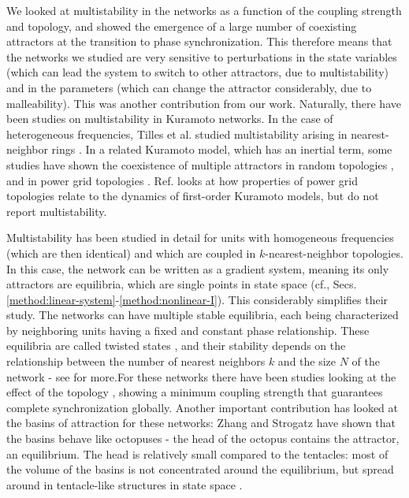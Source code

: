 We looked at multistability in the networks as a function of the coupling strength and topology, and showed the emergence of a large number of coexisting attractors at the transition to phase synchronization. This therefore means that the networks we studied are very sensitive to perturbations in the state variables (which can lead the system to switch to other attractors, due to multistability) and in the parameters (which can change the attractor considerably, due to malleability). This was another contribution from our work. Naturally, there have been studies on multistability in Kuramoto networks. In the case of heterogeneous frequencies, Tilles et al. studied multistability arising in nearest-neighbor rings \cite{tilles2011multistable}. In a related Kuramoto model, which has an inertial term, some studies have shown the coexistence of multiple attractors in random topologies \cite{gelbrecht2020monte}, and in power grid topologies \cite{hellmann2020network, halekotte2021transient}. Ref. \cite{potratzki2024synchronization} looks at how properties of power grid topologies relate to the dynamics of first-order Kuramoto models, but do not report multistability.

Multistability has been studied in detail for units with homogeneous frequencies (which are then identical) and which are coupled in $k$-nearest-neighbor topologies. In this case, the network can be written as a gradient system, meaning its only attractors are equilibria, which are single points in state space (cf., Secs. \ref{method:linear-system}-\ref{method:nonlinear-I}). This considerably simplifies their study. The networks can have multiple stable equilibria, each being characterized by neighboring units having a fixed and constant phase relationship. These equilibria are called twisted states \cite{wiley2006the}, and their stability depends on the relationship between the number of nearest neighbors $k$ and the size $N$ of the network \cite{wiley2006the} - see  for more.For these networks there have been studies looking at the effect of the topology \cite{townsend2020dense}, showing a minimum coupling strength that guarantees complete synchronization globally. Another important contribution has looked at the basins of attraction for these networks: Zhang and Strogatz have shown that the basins behave like octopuses - the head of the octopus contains the attractor, an equilibrium. The head is relatively small compared to the tentacles: most of the volume of the basins is not concentrated around the equilibrium, but spread around in tentacle-like structures in state space \cite{zhang2021basins}. 

